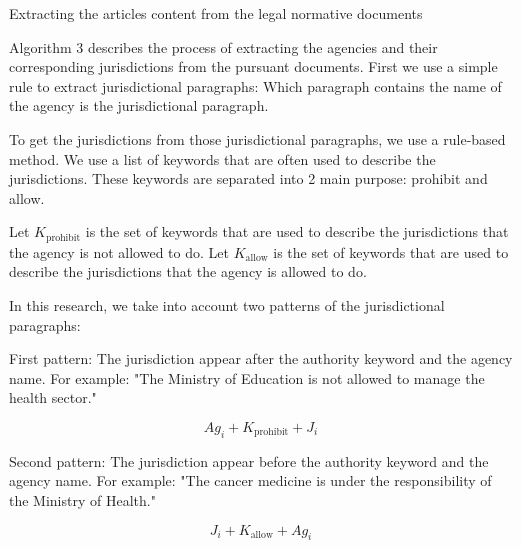     \begin{algorithm}
        \caption{Extracting the articles content from the legal normative documents}

    Algorithm 3 describes the process of extracting the agencies and their corresponding jurisdictions from the pursuant documents. First we use a simple rule to extract jurisdictional paragraphs: Which paragraph contains the name of the agency is the jurisdictional paragraph.

    To get the jurisdictions from those jurisdictional paragraphs, we use a rule-based method. We use a list of keywords that are often used to describe the jurisdictions. These keywords are separated into 2 main purpose: prohibit and allow.

    Let $K_{\text{prohibit}}$ is the set of keywords that are used to describe the jurisdictions that the agency is not allowed to do. Let $K_{\text{allow}}$ is the set of keywords that are used to describe the jurisdictions that the agency is allowed to do.

    In this research, we take into account two patterns of the jurisdictional paragraphs:

    First pattern: The jurisdiction appear after the authority keyword and the agency name. For example: "The Ministry of Education is not allowed to manage the health sector."

    $$
        Ag_i + K_{\text{prohibit}} + J_i
    $$

    Second pattern: The jurisdiction appear before the authority keyword and the agency name. For example: "The cancer medicine is under the responsibility of the Ministry of Health."

    $$
        J_i + K_{\text{allow}} + Ag_i
    $$


\end{algorithm}

